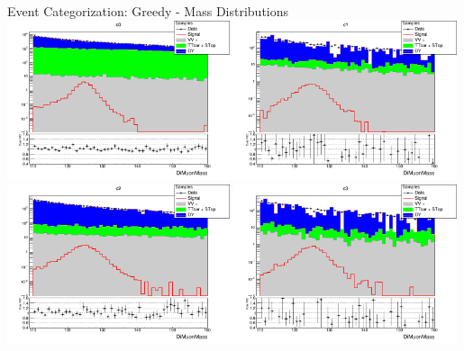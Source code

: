 \documentclass[pdf, 9pt]{beamer}
\begin{document}
  \begin{frame}{Event Categorization: Greedy - Mass Distributions}
    \includegraphics[width=0.49\textwidth, height=0.45\textheight]{figs/higgs/distributions/bdt_uf/distribution__c0__DiMuonMass__logY.png}
    \includegraphics[width=0.49\textwidth, height=0.45\textheight]{figs/higgs/distributions/bdt_uf/distribution__c1__DiMuonMass__logY.png}\\
    \includegraphics[width=0.49\textwidth, height=0.45\textheight]{figs/higgs/distributions/bdt_uf/distribution__c2__DiMuonMass__logY.png}
    \includegraphics[width=0.49\textwidth, height=0.45\textheight]{figs/higgs/distributions/bdt_uf/distribution__c3__DiMuonMass__logY.png}
  \end{frame}
\end{document}
